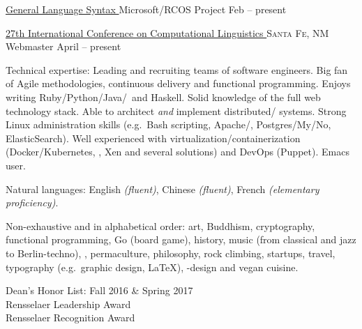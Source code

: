 \documentclass[11pt,a4paper]{article}
\begin{document}
\headedsection
  {\href{https://github.com/HighSchoolHacking/GLS}{General Language Syntax }}
    {\headedsubsection
        {Microsoft/RCOS Project}
        {Feb  -- present}
    }

\headedsection
  {\href{http://coling2018.org}{27th International Conference on Computational Linguistics }}
  {\textsc{Santa Fe, NM}} {%
  \headedsubsection
    {Webmaster}
    {April  -- present}
    {}
}

\spacedhrule{0.5em}{-0.4em}


\inlineheadsection  %
  {Technical expertise:}
  {Leading and recruiting teams of software engineers.  Big fan of Agile methodologies, continuous delivery and functional programming.  Enjoys writing Ruby/\nsp Python/\nsp Java/\nsp \CPP~and Haskell.  Solid knowledge of the full web technology stack.  Able to architect \textit{and} implement distributed/ systems.  Strong Linux administration skills (e.g.\ Bash scripting, Apache/, Postgres/My/No, ElasticSearch).  Well experienced with virtualization/containerization (Docker/Kubernetes, , Xen and several  solutions) and DevOps (Puppet).  Emacs user.}

\vspace{0.5em}
\inlineheadsection
  {Natural languages:}
  {English \emph{(fluent)}, Chinese \emph{(fluent)}, French \emph{(elementary proficiency)}.}


\spacedhrule{1.6em}{-0.4em}


\inlineheadsection
  {Non-exhaustive and in alphabetical order:}
  {art, Buddhism, cryptography, functional programming, Go (board game), history, music (from classical and jazz to Berlin-techno), , permaculture, philosophy, rock climbing, startups, travel, typography (e.g.\ graphic design, \LaTeX), -design and vegan cuisine.}

\spacedhrule{1.6em}{-0.4em}

  \indent Dean's Honor List: Fall 2016 \& Spring 2017 \\
  \indent Rensselaer Leadership Award \\      
  \indent Rensselaer Recognition Award \\ 
\end{document}

